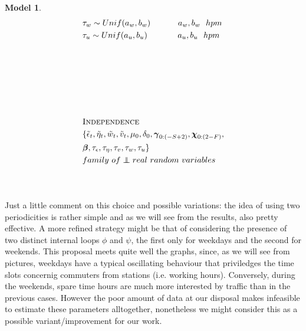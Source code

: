 \documentclass[11pt,twoside]{report}
\newcommand\independent{\protect\mathpalette{\protect\independenT}{\perp}}
\def\independenT#1#2{\mathrel{\rlap{$#1#2$}\mkern2mu{#1#2}}}
\newtheorem{model}{Model}
\begin{document}
\begin{model}
\begin{equation*}
\begin{aligned}[c]
 	&\tau_w\sim Unif(a_w, b_w)\quad\quad\quad\ a_w, b_w\ \ hpm\\
 	&\tau_u\sim Unif(a_u, b_u)\quad\quad\quad\ \ a_u, b_u\ \ hpm\\
 	&\\
 	&\\
 	&\\
 	&\\
 	&\\
 	&\\
 	&\textsc{Independence}\\
 	&\{\tilde{\epsilon}_t, \tilde{\eta}_t, \tilde{w}_t, \tilde{v}_t, \mu_0, \delta_0, \boldsymbol{\gamma}_{0:(-S+2)}, \boldsymbol{\chi}_{0:(2-F)},\\&\boldsymbol{\beta}, \tau_\epsilon, \tau_\eta, \tau_v, \tau_w, \tau_u \}\\ &family\ of \independent real\ random\ variables\\
 	&\\
 	&\\
 	\end{aligned}
 	\end{equation*}
 \end{model}

Just a little comment on this choice and possible variations: the idea of using two periodicities is rather simple and as we will see from the results, also pretty effective. A more refined strategy might be that of considering the presence of two distinct internal loops $ \phi $ and $ \psi $, the first only for weekdays and the second for weekends. This proposal meets quite well the graphs, since, as we will see from pictures, weekdays have a typical oscillating behaviour that priviledges the time slots concernig commuters from stations (i.e. working hours). Conversely, during the weekends, spare time hours are much more interested by traffic than in the previous cases. However the poor amount of data at our disposal makes infeasible to estimate these parameters alltogether, nonetheless we might consider this as a possible variant/improvement for our work. 
\end{document}
